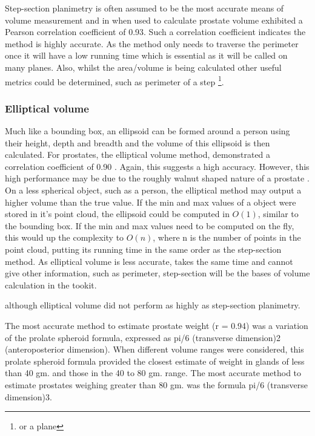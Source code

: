 Step-section planimetry is often assumed to be the most accurate means of volume measurement and in when used to calculate prostate volume \cite{K1991} exhibited a Pearson correlation coefficient of 0.93. 
Such a correlation coefficient indicates the method is highly accurate.
As the method only needs to traverse the perimeter once it will have a low running time which is essential as it will be called on many planes. Also, whilst the area/volume is being calculated other useful metrics could be determined, such as perimeter of a step \footnote{or a plane}.\\

\subsubsection{Elliptical volume}
Much like a bounding box, an ellipsoid can be formed around a person using their height, depth and breadth and the volume of this ellipsoid is then calculated. For prostates, the elliptical volume method, demonstrated a correlation coefficient of 0.90 \cite{K1991}. Again, this suggests a high accuracy. However, this high performance may be due to the roughly walnut shaped nature of a prostate . On a less spherical object, such as a person, the elliptical method may output a higher volume than the true value. If the min and max values of a object were stored in it's point cloud, the ellipsoid could be computed in $O(1)$, similar to the bounding box. If the min and max values need to be computed on the fly, this would up the complexity to $O(n)$, where n is the number of points in the point cloud, putting its running time in the same order as the step-section method. As elliptical volume is less accurate, takes the same time and cannot give other information, such as perimeter, step-section will be the bases of volume calculation in the tookit.

although elliptical volume did not perform as highly as step-section planimetry.

The most accurate method to estimate prostate weight (r = 0.94) was a variation of the prolate spheroid formula, expressed as pi/6 (transverse dimension)2 (anteroposterior dimension). When different volume ranges were considered, this prolate spheroid formula provided the closest estimate of weight in glands of less than 40 gm. and those in the 40 to 80 gm. range. The most accurate method to estimate prostates weighing greater than 80 gm. was the formula pi/6 (transverse dimension)3. 